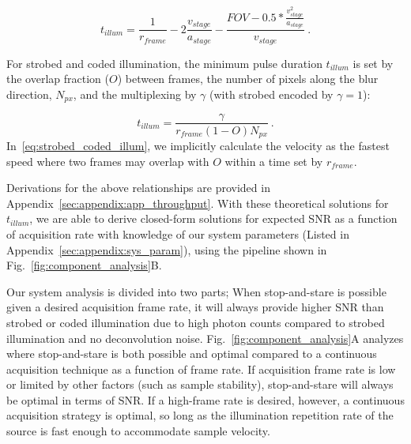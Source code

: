 \begin{equation}
\label{eq:sns_illum}
t_{illum} = \frac{1}{r_{frame}} - 2\frac{v_{stage}}{a_{stage}} - \frac{FOV - 0.5 * \frac{v_{stage}^2}{a_{stage}}}{v_{stage}}\:.
\end{equation}

For strobed and coded illumination, the minimum pulse duration $t_{illum}$ is set by the overlap fraction ($O$) between frames, the number of pixels along the blur direction, $N_{px}$, and the multiplexing by $\gamma$ (with strobed encoded by $\gamma=1$):

\begin{equation}
\label{eq:strobed_coded_illum}
t_{illum} = \frac{\gamma}{r_{frame}(1 - O) N_{px}}\:.
\end{equation}
In~\eqref{eq:strobed_coded_illum}, we implicitly calculate the velocity as the fastest speed where two frames may overlap with $O$ within a time set by $r_{frame}$.

Derivations for the above relationships are provided in Appendix~\ref{sec:appendix:app_throughput}. With these theoretical solutions for $t_{illum}$, we are able to derive closed-form solutions for expected SNR as a function of acquisition rate with knowledge of our system parameters (Listed in Appendix~\ref{sec:appendix:sys_param}), using the pipeline shown in Fig.~\ref{fig:component_analysis}B.

Our system analysis is divided into two parts; When stop-and-stare is possible given a desired acquisition frame rate, it will always provide higher SNR than strobed or coded illumination due to high photon counts compared to strobed illumination and no deconvolution noise. Fig.~\ref{fig:component_analysis}A analyzes where stop-and-stare is both possible and optimal compared to a continuous acquisition technique as a function of frame rate. If acquisition frame rate is low or limited by other factors (such as sample stability), stop-and-stare will always be optimal in terms of SNR. If a high-frame rate is desired, however, a continuous acquisition strategy is optimal, so long as the illumination repetition rate of the source is fast enough to accommodate sample velocity.

